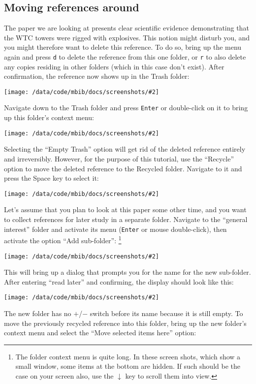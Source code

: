 \documentclass[10pt]{article}
\newcommand*{\key}[1]{\texttt{#1}\xspace}
\newcommand*{\arrowdown}{\key{$\downarrow$}}
\newcommand{\screenshot}[2][]{%
\medskip\par
\begin{center}
\texttt{[image: /data/code/mbib/docs/screenshots/\#2]}
\end{center}}
\begin{document}
\subsection{Moving references around}
\label{sec:moving}

The paper we are looking at presents clear scientific evidence demonstrating that the WTC towers were rigged with explosives. This notion might disturb you, and you might therefore want to delete this reference. To do so, bring up the menu again and press \texttt{d} to delete the reference from this one folder, or \texttt{r} to also delete any copies residing in other folders (which in this case don't exist). After confirmation, the reference now shows up in the Trash folder:

\screenshot{harrit-trash}

\noindent Navigate down to the Trash folder and press \key{Enter} or double-click on it to bring up this folder's context menu:

\screenshot{trash-menu}

\noindent Selecting the ``Empty Trash'' option will get rid of the deleted reference entirely and irreversibly. However, for the purpose of this tutorial, use the ``Recycle'' option to move the deleted reference to the Recycled folder. Navigate to it and press the Space key to select it: 

\screenshot{harrit-recycled}

\noindent Let's assume that you plan to look at this paper some other time, and you want to collect references for later study in a separate folder. Navigate to the ``general interest'' folder and activate its menu (\key{Enter} or mouse double-click), then activate the option ``Add sub-folder'':%
%
\footnote{The folder context menu is quite long. In these screen shots, which show a small window, some items at the bottom are hidden. If such should be the case on your screen also, use the \arrowdown key to scroll them into view.}

\screenshot{folder-menu}

\noindent This will bring up a dialog that prompts you for the name for the new sub-folder. After entering ``read later'' and confirming, the display should look like this:

\screenshot{read-later}

\noindent The new folder has no $+$/$-$ switch before its name because it is still empty. To move the previously recycled reference into this folder, bring up the new folder's context menu and select the ``Move selected items here'' option:
\end{document}
